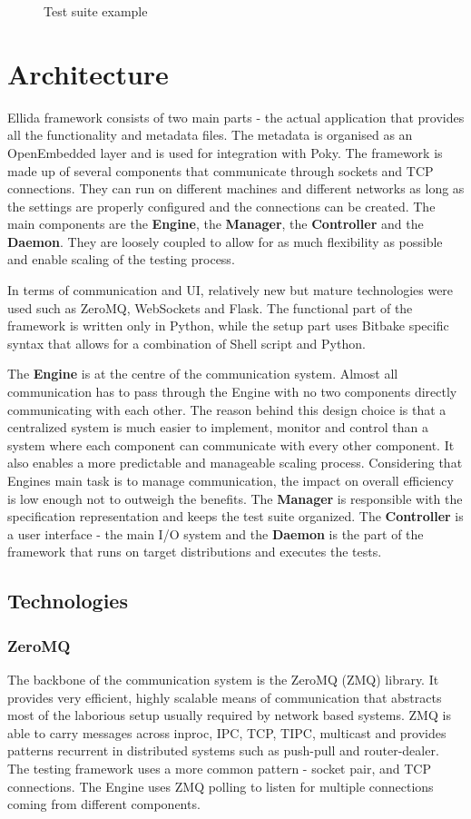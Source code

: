 \begin{figure}[htb!]
\begin{minipage}{0.48\textwidth}
	\caption{Test suite example}
    \end{minipage}
\end{figure}


\section{Architecture}
Ellida framework consists of two main parts - the actual application that provides all the functionality and metadata files. The metadata is organised as an OpenEmbedded layer and is used for integration with Poky. The framework is made up of several components that communicate through sockets and TCP connections. They can run on different machines and different networks as long as the settings are properly configured and the connections can be created. The main components are the \textbf{Engine}, the \textbf{Manager}, the \textbf{Controller} and the \textbf{Daemon}. They are loosely coupled to allow for as much flexibility as possible and enable scaling of the testing process.

In terms of communication and UI, relatively new but mature technologies were used such as ZeroMQ, WebSockets and Flask. The functional part of the framework is written only in Python, while the setup part uses Bitbake specific syntax that allows for a combination of Shell script and Python.

The \textbf{Engine} is at the centre of the communication system. Almost all communication has to pass through the Engine with no two components directly communicating with each other. The reason behind this design choice is that a centralized system is much easier to implement, monitor and control than a system where each component can communicate with every other component. It also enables a more predictable and manageable scaling process. Considering that Engines main task is to manage communication, the impact on overall efficiency is low enough not to outweigh the benefits. The \textbf{Manager} is responsible with the specification representation and keeps the test suite organized. The \textbf{Controller} is a user interface - the main I/O system and the \textbf{Daemon} is the part of the framework that runs on target distributions and executes the tests.

\subsection{Technologies}
\subsubsection*{ZeroMQ}
The backbone of the communication system is the ZeroMQ (ZMQ) library. It provides very efficient, highly scalable means of communication that abstracts most of the laborious setup usually required by network based systems. ZMQ is able to carry messages across inproc, IPC, TCP, TIPC, multicast and provides patterns recurrent in distributed systems such as push-pull and router-dealer. The testing framework uses a more common pattern - socket pair, and TCP connections. The Engine uses ZMQ polling to listen for multiple connections coming from different components.

